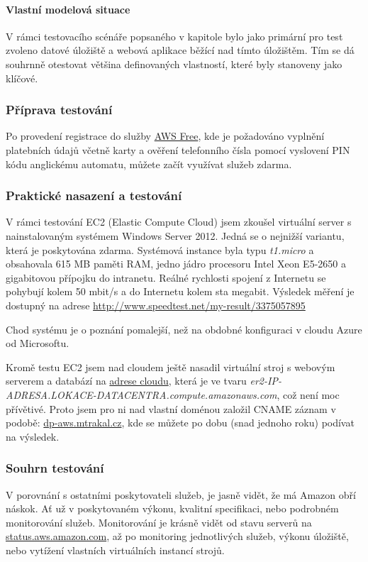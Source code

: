 \paragraph{Vlastní modelová situace}
V rámci testovacího scénáře popsaného v kapitole  bylo jako primární pro test zvoleno datové úložiště a webová aplikace běžící nad tímto úložištěm. Tím se dá souhrnně otestovat většina definovaných vlastností, které byly stanoveny jako klíčové.

\subsubsection{Příprava testování}
Po provedení registrace do služby \href{https://aws.amazon.com/free/}{AWS Free}, kde je požadováno vyplnění platebních údajů včetně karty a ověření telefonního čísla pomocí vyslovení PIN kódu anglickému automatu, můžete začít využívat služeb zdarma.

\subsubsection{Praktické nasazení a testování}
V rámci testování EC2 (Elastic Compute Cloud) jsem zkoušel virtuální server s nainstalovaným systémem Windows Server 2012. Jedná se o nejnižší variantu, která je poskytována zdarma. Systémová instance byla typu \textit{t1.micro} a obsahovala 615 MB paměti RAM, jedno jádro procesoru Intel Xeon E5-2650 a gigabitovou přípojku do intranetu. Reálné rychlosti spojení z Internetu se pohybují kolem 50 mbit/s a do Internetu kolem sta megabit. Výsledek měření je dostupný na adrese \href{http://www.speedtest.net/my-result/3375057895}{http://www.speedtest.net/my-result/3375057895}

Chod systému je o poznání pomalejší, než na obdobné konfiguraci v cloudu Azure od Microsoftu.

Kromě testu EC2 jsem nad cloudem ještě nasadil virtuální stroj s webovým serverem a databází na \href{http://ec2-54-186-102-209.us-west-2.compute.amazonaws.com/}{adrese cloudu}, která je ve tvaru \textit{er2-IP-ADRESA.LOKACE-DATACENTRA.compute.amazonaws.com}, což není moc přívětivé. Proto jsem pro ni nad vlastní doménou založil CNAME záznam v podobě: \href{http://dp-aws.mtrakal.cz}{dp-aws.mtrakal.cz}, kde se můžete po dobu (snad jednoho roku) podívat na výsledek.

\subsubsection{Souhrn testování}
V porovnání s ostatními poskytovateli služeb, je jasně vidět, že má Amazon obří náskok. Ať už v poskytovaném výkonu, kvalitní specifikaci, nebo podrobném monitorování služeb. Monitorování je krásně vidět od stavu serverů na \href{http://status.aws.amazon.com/}{status.aws.amazon.com}, až po monitoring jednotlivých služeb, výkonu úložiště, nebo vytížení vlastních virtuálních instancí strojů.

